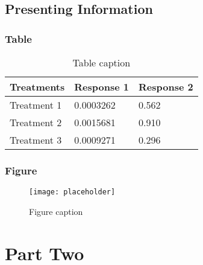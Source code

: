 \documentclass[11pt,fleqn]{book} %
\begin{document}


\chapter{Presenting Information}

\section{Table}

\begin{table}[h]
\centering
\begin{tabular}{l l l}
\toprule
\textbf{Treatments} & \textbf{Response 1} & \textbf{Response 2}\\
\midrule
Treatment 1 & 0.0003262 & 0.562 \\
Treatment 2 & 0.0015681 & 0.910 \\
Treatment 3 & 0.0009271 & 0.296 \\
\bottomrule
\end{tabular}
\caption{Table caption}
\end{table}


\section{Figure}

\begin{figure}[h]
\centering\texttt{[image: placeholder]}
\caption{Figure caption}
\end{figure}





\part{Part Two}

\end{document}
